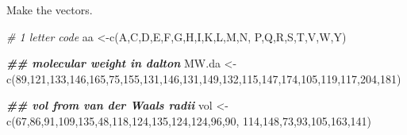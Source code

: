 \documentclass[
]{book}
\newenvironment{Shaded}{\begin{snugshade}}{\end{snugshade}}
\newcommand{\CommentTok}[1]{\textcolor[rgb]{0.56,0.35,0.01}{\textit{#1}}}
\newcommand{\DecValTok}[1]{\textcolor[rgb]{0.00,0.00,0.81}{#1}}
\newcommand{\DocumentationTok}[1]{\textcolor[rgb]{0.56,0.35,0.01}{\textbf{\textit{#1}}}}
\newcommand{\FunctionTok}[1]{\textcolor[rgb]{0.00,0.00,0.00}{#1}}
\newcommand{\NormalTok}[1]{#1}
\newcommand{\OtherTok}[1]{\textcolor[rgb]{0.56,0.35,0.01}{#1}}
\newcommand{\StringTok}[1]{\textcolor[rgb]{0.31,0.60,0.02}{#1}}
\begin{document}
Make the vectors.

\begin{Shaded}
\begin{Highlighting}[]
\CommentTok{\# 1 letter code}
\NormalTok{aa        }\OtherTok{\textless{}{-}}\FunctionTok{c}\NormalTok{(}\StringTok{\textquotesingle{}A\textquotesingle{}}\NormalTok{,}\StringTok{\textquotesingle{}C\textquotesingle{}}\NormalTok{,}\StringTok{\textquotesingle{}D\textquotesingle{}}\NormalTok{,}\StringTok{\textquotesingle{}E\textquotesingle{}}\NormalTok{,}\StringTok{\textquotesingle{}F\textquotesingle{}}\NormalTok{,}\StringTok{\textquotesingle{}G\textquotesingle{}}\NormalTok{,}\StringTok{\textquotesingle{}H\textquotesingle{}}\NormalTok{,}\StringTok{\textquotesingle{}I\textquotesingle{}}\NormalTok{,}\StringTok{\textquotesingle{}K\textquotesingle{}}\NormalTok{,}\StringTok{\textquotesingle{}L\textquotesingle{}}\NormalTok{,}\StringTok{\textquotesingle{}M\textquotesingle{}}\NormalTok{,}\StringTok{\textquotesingle{}N\textquotesingle{}}\NormalTok{,}
              \StringTok{\textquotesingle{}P\textquotesingle{}}\NormalTok{,}\StringTok{\textquotesingle{}Q\textquotesingle{}}\NormalTok{,}\StringTok{\textquotesingle{}R\textquotesingle{}}\NormalTok{,}\StringTok{\textquotesingle{}S\textquotesingle{}}\NormalTok{,}\StringTok{\textquotesingle{}T\textquotesingle{}}\NormalTok{,}\StringTok{\textquotesingle{}V\textquotesingle{}}\NormalTok{,}\StringTok{\textquotesingle{}W\textquotesingle{}}\NormalTok{,}\StringTok{\textquotesingle{}Y\textquotesingle{}}\NormalTok{)}


\DocumentationTok{\#\# molecular weight in dalton}
\NormalTok{MW.da     }\OtherTok{\textless{}{-}}\FunctionTok{c}\NormalTok{(}\DecValTok{89}\NormalTok{,}\DecValTok{121}\NormalTok{,}\DecValTok{133}\NormalTok{,}\DecValTok{146}\NormalTok{,}\DecValTok{165}\NormalTok{,}\DecValTok{75}\NormalTok{,}\DecValTok{155}\NormalTok{,}\DecValTok{131}\NormalTok{,}\DecValTok{146}\NormalTok{,}\DecValTok{131}\NormalTok{,}\DecValTok{149}\NormalTok{,}\DecValTok{132}\NormalTok{,}\DecValTok{115}\NormalTok{,}\DecValTok{147}\NormalTok{,}\DecValTok{174}\NormalTok{,}\DecValTok{105}\NormalTok{,}\DecValTok{119}\NormalTok{,}\DecValTok{117}\NormalTok{,}\DecValTok{204}\NormalTok{,}\DecValTok{181}\NormalTok{)}

\DocumentationTok{\#\# vol from van der Waals radii }
\NormalTok{vol    }\OtherTok{\textless{}{-}}\FunctionTok{c}\NormalTok{(}\DecValTok{67}\NormalTok{,}\DecValTok{86}\NormalTok{,}\DecValTok{91}\NormalTok{,}\DecValTok{109}\NormalTok{,}\DecValTok{135}\NormalTok{,}\DecValTok{48}\NormalTok{,}\DecValTok{118}\NormalTok{,}\DecValTok{124}\NormalTok{,}\DecValTok{135}\NormalTok{,}\DecValTok{124}\NormalTok{,}\DecValTok{124}\NormalTok{,}\DecValTok{96}\NormalTok{,}\DecValTok{90}\NormalTok{,}
              \DecValTok{114}\NormalTok{,}\DecValTok{148}\NormalTok{,}\DecValTok{73}\NormalTok{,}\DecValTok{93}\NormalTok{,}\DecValTok{105}\NormalTok{,}\DecValTok{163}\NormalTok{,}\DecValTok{141}\NormalTok{)}


\end{Highlighting}
\end{Shaded}
\end{document}
